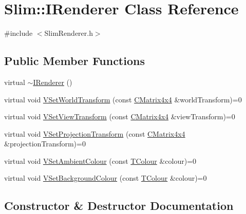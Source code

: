 \hypertarget{class_slim_1_1_i_renderer}{}\section{Slim\+:\+:I\+Renderer Class Reference}
\label{class_slim_1_1_i_renderer}


{\ttfamily \#include $<$Slim\+Renderer.\+h$>$}

\subsection*{Public Member Functions}
\begin{DoxyCompactItemize}
\item 
virtual \hyperlink{class_slim_1_1_i_renderer_adf85c7721097f6c9b41022086b0082fa}{$\sim$\+I\+Renderer} ()
\item 
virtual void \hyperlink{class_slim_1_1_i_renderer_ab9d0e8b1c68abcf080641118e4f26a94}{V\+Set\+World\+Transform} (const \hyperlink{class_slim_1_1_c_matrix4x4}{C\+Matrix4x4} \&world\+Transform)=0
\item 
virtual void \hyperlink{class_slim_1_1_i_renderer_a9bc7f2660e822a10ec062ce727d5d4d9}{V\+Set\+View\+Transform} (const \hyperlink{class_slim_1_1_c_matrix4x4}{C\+Matrix4x4} \&view\+Transform)=0
\item 
virtual void \hyperlink{class_slim_1_1_i_renderer_a88f1c03045d721435a3762cc5c8a6da0}{V\+Set\+Projection\+Transform} (const \hyperlink{class_slim_1_1_c_matrix4x4}{C\+Matrix4x4} \&projection\+Transform)=0
\item 
virtual void \hyperlink{class_slim_1_1_i_renderer_a86d55f523502b74282bc6f81683655a7}{V\+Set\+Ambient\+Colour} (const \hyperlink{struct_slim_1_1_t_colour}{T\+Colour} \&colour)=0
\item 
virtual void \hyperlink{class_slim_1_1_i_renderer_a68ed64b8a7f530a2a487a3c65ae1ea0e}{V\+Set\+Background\+Colour} (const \hyperlink{struct_slim_1_1_t_colour}{T\+Colour} \&colour)=0
\end{DoxyCompactItemize}


\subsection{Constructor \& Destructor Documentation}
\hypertarget{class_slim_1_1_i_renderer_adf85c7721097f6c9b41022086b0082fa}{}
